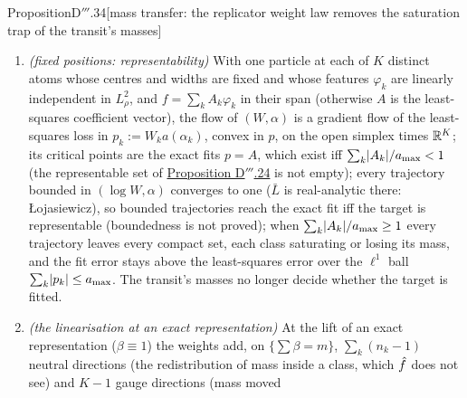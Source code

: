 \begin{thm}{Proposition}{D$'''$.34}[mass transfer: the replicator weight law removes the saturation trap of the
transit's masses]
\begin{enumerate}[label=\textup{(\roman*)}]
    masses: the replicator selects the masses of each class configuration and moves the Gaussian kernel's bias
    (Numerics (G)); and a class whose particles carry unequal weights is not exactly replicated at a biased
    stationary point. The difference is the saturated transient: when a class is short of mass
    ($\abs{A_k} > W_ka_{\max}$) the equal-weight loop at fixed positions stays biased (it has no critical point)
    while $\abs{a_k}\to a_{\max}$ with $\langle r\varphi_k\rangle\not\to0$, its amplitude gradient exponentially
    small in $\alpha_k$ (heuristically $\alpha_k$ grows like $(a_{\max}/2)\log s$); under \textup{($\mathfrak{F}$)}
    the starved class's mass grows at the rate $\gamma(u_k - \lambda)$,
    $u_k\approx a_{\max}\abs{\langle r\varphi_k\rangle}$ --- $\dd W_k/\dd s = \gamma W_k(1 - W_k)u_k > 0$ exactly
    when the class's particles coincide and $u_l = 0$ for the other classes --- and the others take up the gauge
    (\hyperref[res:thmDppp:28]{Proposition D$'''$.28}: their $p_l = W_la_l$ kept by $\abs{a_l}$ increasing).
  \item \emph{(fixed positions: representability)} With one particle at each of $K$ distinct atoms whose centres and
    widths are fixed and whose features $\varphi_k$ are linearly independent in $L^2_\rho$, and
    $f = \sum_kA_k\varphi_k$ in their span (otherwise $A$ is the least-squares coefficient vector), the flow of
    $(W,\alpha)$ is a gradient flow of the least-squares loss in $p_k := W_ka(\alpha_k)$, convex in $p$, on the open
    simplex times $\mathbb{R}^K$; its critical points are the exact fits $p = A$, which exist iff
    $\sum_k\lvert A_k\rvert/a_{\max} < 1$ (the representable set of \hyperref[res:thmDppp:24]{Proposition D$'''$.24} is not
    empty); every trajectory bounded in $(\log W,\alpha)$ converges to one ($\bar L$ is real-analytic there:
    {\L}ojasiewicz), so bounded trajectories reach the exact fit iff the target is representable (boundedness is not
    proved); when $\sum_k\lvert A_k\rvert/a_{\max}\ge1$ every trajectory leaves every compact set, each class saturating or
    losing its mass, and the fit error stays above the least-squares error over the $\ell^1$ ball
    $\sum_k\lvert p_k\rvert\le a_{\max}$. The transit's masses no longer decide whether the target is fitted.
  \item \emph{(the linearisation at an exact representation)} At the lift of an exact representation
    ($\beta\equiv1$) the weights add, on $\{\sum\beta = m\}$, $\sum_k(n_k - 1)$ neutral directions (the
    redistribution of mass inside a class, which $\hat f$ does not see) and $K - 1$ gauge directions (mass moved

\end{enumerate}
\end{thm}
